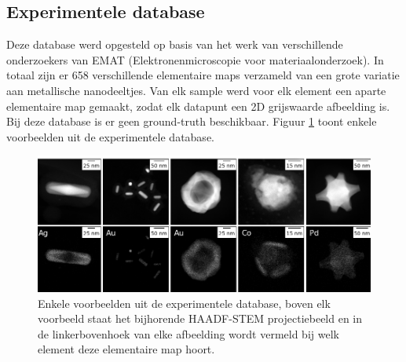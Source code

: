 \documentclass{report}
\begin{document}
\subsection{Experimentele database}
Deze database werd opgesteld op basis van het werk van verschillende onderzoekers van EMAT (Elektronenmicroscopie voor materiaalonderzoek). In totaal zijn er 658 verschillende elementaire maps verzameld van een grote variatie aan metallische nanodeeltjes. Van elk sample werd voor elk element een aparte elementaire map gemaakt, zodat elk datapunt een 2D grijswaarde afbeelding is. Bij deze database is er geen ground-truth beschikbaar. Figuur \ref{fig:data_expdb} toont enkele voorbeelden uit de experimentele database.
\begin{figure}[h!]
	\centering
	\includegraphics[width=15cm]{images/data/expdb.png}
	\caption{Enkele voorbeelden uit de experimentele database, boven elk voorbeeld staat het bijhorende HAADF-STEM projectiebeeld en in de linkerbovenhoek van elke afbeelding wordt vermeld bij welk element deze elementaire map hoort.}
	\label{fig:data_expdb}
\end{figure}
\end{document}
